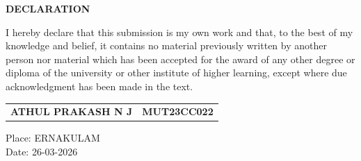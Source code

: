 \documentclass[a4paper,12pt,oneside]{report}
\begin{document}
\begin{titlepage}
{\scshape \centering \Large \bfseries DECLARATION \par}
\vspace{1.5cm}
{I hereby declare that this submission is my own work and that, to the best of my knowledge and belief, it contains no material previously written by another person nor material which has been accepted for the award of any other degree or diploma of the university or other institute of higher learning, except where due acknowledgment has been made in the text.}
\vspace{2cm}
\begin{flushright}
\begin{tabular}{lr}
\textbf{ATHUL PRAKASH N J} & \textbf{MUT23CC022} \\
\end{tabular}
\end{flushright}
\par

\vfill
\noindent Place: ERNAKULAM\\
\noindent Date: 26-03-2026
\end{titlepage}
\end{document}
